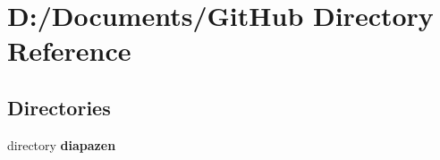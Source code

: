 \section{D\-:/\-Documents/\-Git\-Hub Directory Reference}
\label{dir_72cae8256a7437d05147a3f1631a610a}
\subsection*{Directories}
\begin{DoxyCompactItemize}
\item 
directory {\bf diapazen}
\end{DoxyCompactItemize}
